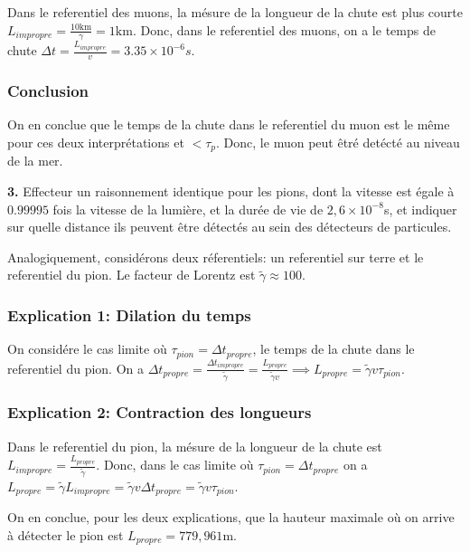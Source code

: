 \documentclass[french]{article}
\begin{document}
	Dans le referentiel des muons, la mésure de la longueur de la chute est plus courte $L_{impropre} = \frac{10 \mathrm{km}}{\gamma} = 1 \mathrm{km}$.	Donc, dans le referentiel des muons, on a le temps de chute $\Delta t = \frac{L_{impropre}}{v} = 3.35 \times 10^{-6}s$.
	
	\subsubsection*{Conclusion}
	
	On en conclue que le temps de la chute dans le referentiel du muon est le même pour ces deux interprétations et $< \tau_p$. Donc, le muon peut êtré detécté au niveau de la mer.

	\begin{tcolorbox}[colback=gray!5!white,colframe=gray!75!black]
		\textbf{3.} Effecteur un raisonnement identique pour les pions, dont la vitesse est égale à $0.99995$ fois la vitesse de la lumière, et la durée de vie de $2,6 \times 10^{-8}$s, et indiquer sur quelle distance ils peuvent être détectés au sein des détecteurs de particules.
	\end{tcolorbox}

	Analogiquement, considérons deux réferentiels: un referentiel sur terre et le referentiel du pion. Le facteur de Lorentz est $\tilde{\gamma} \approx 100$. 
	
	\subsubsection*{Explication 1: Dilation du temps}
	
	On considére le cas limite où $\tau_{pion} = \Delta t_{propre}$, le temps de la chute dans le referentiel du pion. On a $\Delta t_{propre} = \frac{\Delta t_{impropre}}{\tilde{\gamma}} = \frac{L_{propre}}{\tilde{\gamma}v} \implies L_{propre} = \tilde{\gamma}v\tau_{pion}$.
	
	\subsubsection*{Explication 2: Contraction des longueurs}
	
	Dans le referentiel du pion, la mésure de la longueur de la chute est $L_{impropre} = \frac{L_{propre}}{\tilde{\gamma}}$.	Donc, dans le cas limite où $\tau_{pion} = \Delta t_{propre}$ on a $L_{propre} = \tilde{\gamma}L_{impropre} = \tilde{\gamma}v\Delta t_{propre}= \tilde{\gamma}v\tau_{pion}$.
	
	On en conclue, pour les deux explications, que la hauteur maximale où on arrive à détecter le pion est $L_{propre} = 779,961\mathrm{m}$.
	
	
\end{document}
